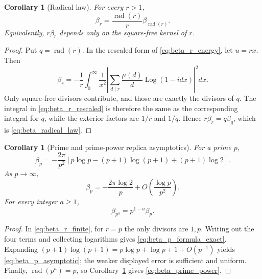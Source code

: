\documentclass[11pt]{amsart}
\numberwithin{equation}{section}
\theoremstyle{plain}
\newtheorem{corollary}[theorem]{Corollary}
\theoremstyle{definition}
\theoremstyle{remark}
\newcommand{\Log}{\operatorname{Log}}
\begin{document}
\begin{corollary}[Radical law]
\label{cor:beta_radical_law}
For every \(r>1\),
\begin{equation}
\boxed{
\beta_r=
\frac{\operatorname{rad}(r)}r
\beta_{\operatorname{rad}(r)}.}
\label{eq:beta_radical_law}
\end{equation}
Equivalently, \(r\beta_r\) depends only on the square-free kernel of \(r\).
\end{corollary}

\begin{proof}
Put \(q=\operatorname{rad}(r)\).  In the rescaled form of
\eqref{eq:beta_r_energy}, let \(u=rx\).  Then
\begin{equation}
\beta_r
=-\frac1r\int_0^\infty
\frac{1}{x^2}
\left|\sum_{d\mid r}\frac{\mu(d)}d\Log(1-idx)\right|^2dx.
\label{eq:beta_r_rescaled}
\end{equation}
Only square-free divisors contribute, and those are exactly the divisors of
\(q\).  The integral in \eqref{eq:beta_r_rescaled} is therefore the same as
the corresponding integral for \(q\), while the exterior factors are
\(1/r\) and \(1/q\).  Hence \(r\beta_r=q\beta_q\), which is
\eqref{eq:beta_radical_law}.
\end{proof}

\begin{corollary}[Prime and prime-power replica asymptotics]
\label{cor:beta_prime_asymptotic}
For a prime \(p\),
\begin{equation}
\boxed{
\beta_p=
-\frac{2\pi}{p^2}
\left[p\log p-(p+1)\log(p+1)+(p+1)\log2\right].}
\label{eq:beta_p_formula_exact}
\end{equation}
As \(p\to\infty\),
\begin{equation}
\beta_p
=-\frac{2\pi\log2}{p}
+O\!\left(\frac{\log p}{p^2}\right).
\label{eq:beta_p_asymptotic}
\end{equation}
For every integer \(a\ge1\),
\begin{equation}
\boxed{\beta_{p^a}=p^{1-a}\beta_p.}
\label{eq:beta_prime_power}
\end{equation}
\end{corollary}

\begin{proof}
In \eqref{eq:beta_r_finite}, for \(r=p\) the only divisors are \(1,p\).
Writing out the four terms and collecting logarithms gives
\eqref{eq:beta_p_formula_exact}.  Expanding
\((p+1)\log(p+1)=p\log p+\log p+1+O(p^{-1})\) yields
\eqref{eq:beta_p_asymptotic}; the weaker displayed error is sufficient and
uniform.  Finally, \(\operatorname{rad}(p^a)=p\), so
Corollary~\ref{cor:beta_radical_law} gives \eqref{eq:beta_prime_power}.
\end{proof}
\end{document}

